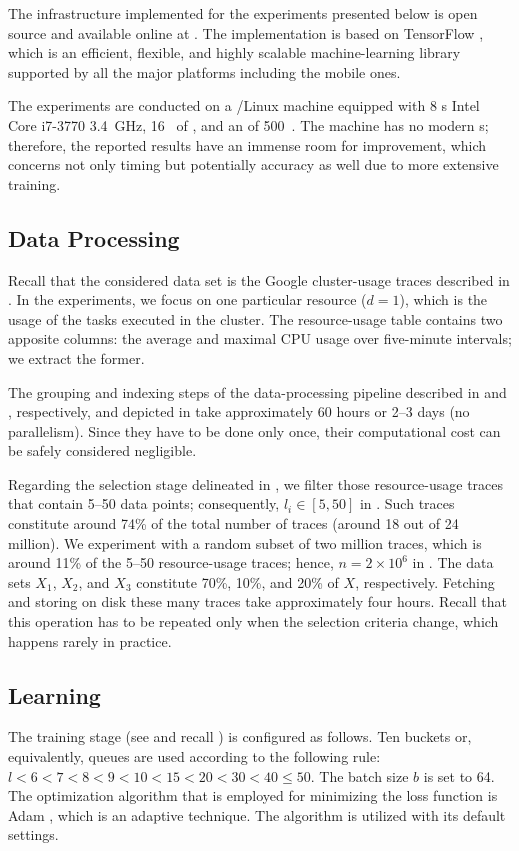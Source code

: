The infrastructure implemented for the experiments presented below is open
source and available online at \cite{sources}. The implementation is based on
TensorFlow \cite{abadi2015}, which is an efficient, flexible, and highly
scalable machine-learning library supported by all the major platforms including
the mobile ones.

The experiments are conducted on a /Linux machine equipped with 8
s Intel Core i7-3770 3.4~GHz, 16~ of , and an  of
500~. The machine has no modern s; therefore, the reported
results have an immense room for improvement, which concerns not only timing but
potentially accuracy as well due to more extensive training.

\subsection{Data Processing}
Recall that the considered data set is the Google cluster-usage traces
\cite{reiss2011} described in . In the experiments, we focus on one
particular resource ($d = 1$), which is the  usage of the tasks executed
in the cluster. The resource-usage table contains two apposite columns: the
average and maximal CPU usage over five-minute intervals; we extract the former.

The grouping and indexing steps of the data-processing pipeline described in
 and , respectively, and depicted in
 take approximately 60 hours or 2--3 days (no parallelism). Since
they have to be done only once, their computational cost can be safely
considered negligible.

Regarding the selection stage delineated in , we filter those
resource-usage traces that contain 5--50 data points; consequently, $l_i \in [5,
50]$ in . Such traces constitute around 74\% of the total number of
traces (around 18 out of 24 million). We experiment with a random subset of two
million traces, which is around 11\% of the 5--50 resource-usage traces; hence,
$n = 2 \times 10^6$ in . The data sets $X_1$, $X_2$, and $X_3$
constitute 70\%, 10\%, and 20\% of $X$, respectively. Fetching and storing on
disk these many traces take approximately four hours. Recall that this operation
has to be repeated only when the selection criteria change, which happens rarely
in practice.

\subsection{Learning}
The training stage (see  and recall ) is
configured as follows. Ten buckets or, equivalently, queues are used according
to the following rule: $l < 6 < 7 < 8 < 9 < 10 < 15 < 20 < 30 < 40 \leq 50$. The
batch size $b$ is set to 64. The optimization algorithm that is employed for
minimizing the loss function is Adam \cite{kingma2014}, which is an adaptive
technique. The algorithm is utilized with its default settings.

